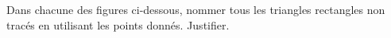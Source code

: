
\begin{exercice}\label{exo2smath-0262}

    Dans chacune des figures ci-dessous, nommer tous les triangles rectangles non tracés en utilisant les points donnés. Justifier.


   


\end{exercice}
